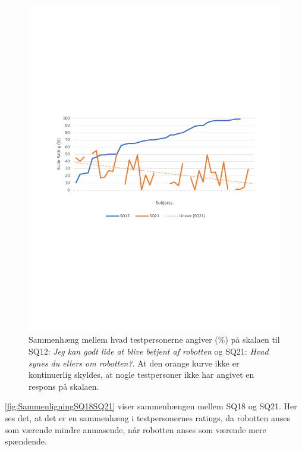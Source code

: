 \begin{figure}[H]
	\centering
	\includegraphics[width=\textwidth]{Figure/Korrelationsgrafer/SQ12+SQ21}
	\caption{Sammenhæng mellem hvad testpersonerne angiver (\%) på skalaen til SQ12: \textit{Jeg kan godt lide at blive betjent af robotten} og SQ21: \textit{Hvad synes du ellers om robotten?}. At den orange kurve ikke er kontinuerlig skyldes, at nogle testpersoner ikke har angivet en respons på skalaen.}
	\label{fig:SammenligningSQ12SQ21}
\end{figure}
\noindent
%
\autoref{fig:SammenligningSQ18SQ21} viser sammenhængen mellem SQ18 og SQ21. Her ses det, at det er en sammenhæng i testpersonernes ratings, da robotten anses som værende mindre anmasende, når robotten anses som værende mere spændende.
%
